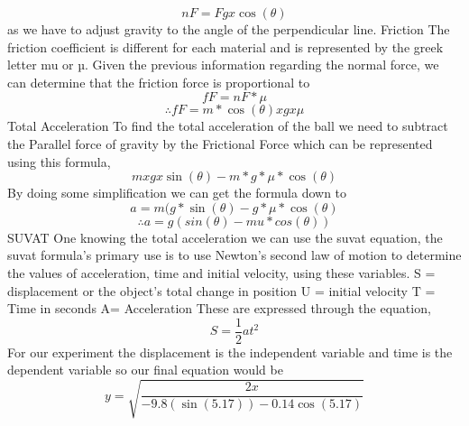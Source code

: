 \documentclass[12pt]{report}
\begin{document}
\[nF = Fg x \cos(\theta)\]
as we have to adjust gravity to the angle of the perpendicular line.
\newline\newline
{\large{Friction}}
\newline
The friction coefficient is different for each material and is represented by the greek letter mu or µ.
Given the previous information regarding the normal force, we can determine that the friction force is proportional to
\[fF = nF * \mu\]
\[∴ fF = m * \cos(\theta) x g x \mu\]
{\large{Total Acceleration}}
\newline
To find the total acceleration of the ball we need to subtract the Parallel force of gravity by the  Frictional Force which can be represented using this formula,
\[m x g x \sin(\theta)- m *g*\mu*\cos(\theta)\]
By doing some simplification we can get the formula down to
\[a = m(g*\sin(\theta) - g*\mu*\cos(\theta)\]
\[∴ a = g(sin(θ) - mu*cos(θ))\]
{\large{SUVAT}}
\newline
One knowing the total acceleration we can use the suvat equation, the suvat formula’s primary use is to use Newton's second law of motion to determine the values of acceleration, time and initial velocity, using these variables. \newline
S = displacement or the object's total change in position \newline
U = initial velocity \newline
T = Time in seconds\newline
A=  Acceleration\newline
These are expressed through the equation,
\[S = \frac{1}{2}at^2\]
For our experiment the displacement is the independent variable and time is the dependent variable so our final equation would be
\[ y = \sqrt{\frac{2x}{-9.8(\sin(5.17))-0.14\cos(5.17)}}\]
\end{document}

